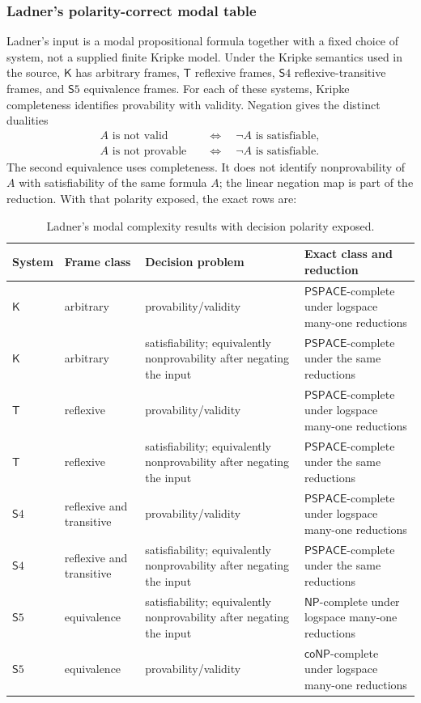 \subsubsection{Ladner's polarity-correct modal table}

Ladner's input is a modal propositional formula together with a fixed choice of
system, not a supplied finite Kripke model.  Under the Kripke semantics used in
the source, \(\mathsf K\) has arbitrary frames, \(\mathsf T\) reflexive frames,
\(\mathsf S4\) reflexive-transitive frames, and \(\mathsf S5\) equivalence
frames.  For each of these systems, Kripke completeness identifies provability
with validity.  Negation gives the distinct dualities
\[
 \begin{aligned}
  A\text{ is not valid}
    &\quad\Longleftrightarrow\quad \neg A\text{ is satisfiable},\\
  A\text{ is not provable}
    &\quad\Longleftrightarrow\quad \neg A\text{ is satisfiable}.
 \end{aligned}
\]
The second equivalence uses completeness.  It does not identify nonprovability
of \(A\) with satisfiability of the same formula \(A\); the linear negation map
is part of the reduction.  With that polarity exposed, the exact rows are:

\begin{table}[htbp]
\centering\scriptsize
\begin{tabularx}{\textwidth}{@{}l l X X@{}}
\toprule
System & Frame class & Decision problem & Exact class and reduction \\
\midrule
\(\mathsf K\) & arbitrary & provability/validity &
\(\mathsf{PSPACE}\)-complete under logspace many-one reductions \\
\(\mathsf K\) & arbitrary & satisfiability; equivalently nonprovability after
negating the input & \(\mathsf{PSPACE}\)-complete under the same reductions \\
\(\mathsf T\) & reflexive & provability/validity &
\(\mathsf{PSPACE}\)-complete under logspace many-one reductions \\
\(\mathsf T\) & reflexive & satisfiability; equivalently nonprovability after
negating the input & \(\mathsf{PSPACE}\)-complete under the same reductions \\
\(\mathsf S4\) & reflexive and transitive & provability/validity &
\(\mathsf{PSPACE}\)-complete under logspace many-one reductions \\
\(\mathsf S4\) & reflexive and transitive & satisfiability; equivalently
nonprovability after negating the input & \(\mathsf{PSPACE}\)-complete under
the same reductions \\
\(\mathsf S5\) & equivalence & satisfiability; equivalently nonprovability
after negating the input & \(\mathsf{NP}\)-complete under logspace many-one
reductions \\
\(\mathsf S5\) & equivalence & provability/validity &
\(\mathsf{coNP}\)-complete under logspace many-one reductions \\
\bottomrule
\end{tabularx}
\caption{Ladner's modal complexity results with decision polarity exposed.}
\label{tab:p09-ladner-polarity}
\end{table}

